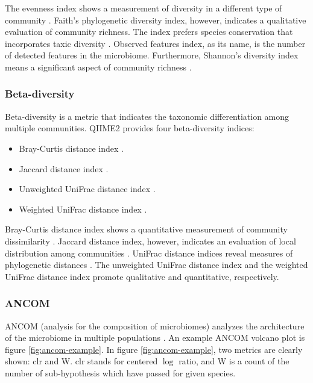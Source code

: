 \documentclass[a4paper]{article}
\begin{document}
                The evenness index shows a measurement of diversity in a different type of community \cite{evenness1}. Faith's phylogenetic diversity index, however, indicates a qualitative evaluation of community richness. The index prefers species conservation that incorporates taxic diversity \cite{faith1}. Observed features index, as its name, is the number of detected features in the microbiome. Furthermore, Shannon's diversity index means a significant aspect of community richness \cite{shannon1}.

            \subsubsection{Beta-diversity}
                Beta-diversity is a metric that indicates the taxonomic differentiation among multiple communities. QIIME2 provides four beta-diversity indices:
                \begin{itemize}
                    \item Bray-Curtis distance index \cite{bray1}.
                    \item Jaccard distance index \cite{jaccard1}.
                    \item Unweighted UniFrac distance index \cite{unifrac1}.
                    \item Weighted UniFrac distance index \cite{unifrac1}.
                \end{itemize}

                Bray-Curtis distance index shows a quantitative measurement of community dissimilarity \cite{bray1}. Jaccard distance index, however, indicates an evaluation of local distribution among communities \cite{jaccard1}. UniFrac distance indices reveal measures of phylogenetic distances \cite{unifrac1}. The unweighted UniFrac distance index and the weighted UniFrac distance index promote qualitative and quantitative, respectively.

            \subsubsection{ANCOM}
                ANCOM (analysis for the composition of microbiomes) analyzes the architecture of the microbiome in multiple populations \cite{ANCOM1}. An example ANCOM volcano plot is figure \ref{fig:ancom-example}. In figure \ref{fig:ancom-example}, two metrics are clearly shown: clr and W. clr stands for centered $\log$ ratio, and W is a count of the number of sub-hypothesis which have passed for given species.
\end{document}
